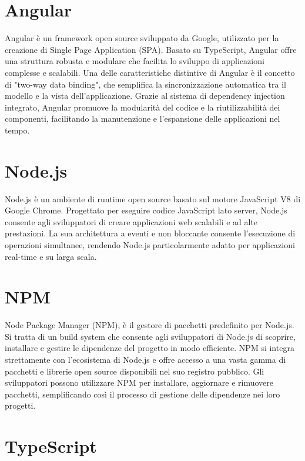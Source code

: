 \documentclass[12pt,a4paper,openright,twoside]{book}
\begin{document}
\section{Angular}

Angular è un framework open source sviluppato da Google, utilizzato per la creazione di Single Page Application (SPA). Basato su TypeScript, Angular offre una struttura robusta e modulare che facilita lo sviluppo di applicazioni complesse e scalabili. Una delle caratteristiche distintive di Angular è il concetto di "two-way data binding", che semplifica la sincronizzazione automatica tra il modello e la vista dell'applicazione. Grazie al sistema di dependency injection integrato, Angular promuove la modularità del codice e la riutilizzabilità dei componenti, facilitando la manutenzione e l'espansione delle applicazioni nel tempo. 

\section{Node.js}

Node.js è un ambiente di runtime open source basato sul motore JavaScript V8 di Google Chrome. Progettato per eseguire codice JavaScript lato server, Node.js consente agli sviluppatori di creare applicazioni web scalabili e ad alte prestazioni. La sua architettura a eventi e non bloccante consente l'esecuzione di operazioni simultanee, rendendo Node.js particolarmente adatto per applicazioni real-time e su larga scala.

\section{NPM}

Node Package Manager (NPM), è il gestore di pacchetti predefinito per Node.js. Si tratta di un build system che consente agli sviluppatori di Node.js di scoprire, installare e gestire le dipendenze del progetto in modo efficiente. NPM si integra strettamente con l'ecosistema di Node.js e offre accesso a una vasta gamma di pacchetti e librerie open source disponibili nel suo registro pubblico. Gli sviluppatori possono utilizzare NPM per installare, aggiornare e rimuovere pacchetti, semplificando così il processo di gestione delle dipendenze nei loro progetti.

\section{TypeScript}
\end{document}
